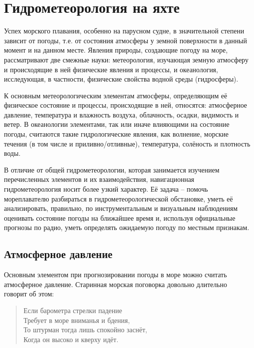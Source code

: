 \twocolumn

\chapter{Гидрометеорология на яхте}

Успех морского плавания, особенно на парусном судне, в значительной
степени зависит от погоды, т.е. от состояния атмосферы у земной
поверхности в данный момент и на данном месте. Явления природы,
создающие погоду на море, рассматривают две смежные науки:
метеорология, изучающая земную атмосферу и происходящие в ней
физические явления и процессы, и океанология, исследующая, в
частности, физические свойства водной среды (гидросферы).

К основным метеорологическим элементам атмосферы, определяющим её
физическое состояние и процессы, происходящие в ней, относятся:
атмосферное давление, температура и влажность воздуха, облачность,
осадки, видимость и ветер. В океанологии элементами, так или иначе
влияющими на состояние погоды, считаются такие гидрологические
явления, как волнение, морские течения (в том числе и
приливно\-/отливные), температура, солёность и плотность воды.

В отличие от общей гидрометеорологии, которая занимается изучением
перечисленных элементов и их взаимодействия, навигационная
гидрометеорология носит более узкий характер. Её задача \--- помочь
мореплавателю разбираться в гидрометеорологической обстановке, уметь
её анализировать, правильно, по инструментальным и визуальным
наблюдениям оценивать состояние погоды на ближайшее время и, используя
официальные прогнозы по радио, уметь определять ожидаемую погоду по
местным признакам.

\section{Атмосферное давление}

Основным элементом при прогнозировании погоды в море можно считать
атмосферное давление. Старинная морская поговорка довольно длительно
говорит об этом:

\begin{quote}
Если барометра стрелки падение \\
Требует в море вниманья и бдения, \\
То штурман тогда лишь спокойно заснёт, \\
Когда он высоко и кверху идёт. \\
\end{quote}


